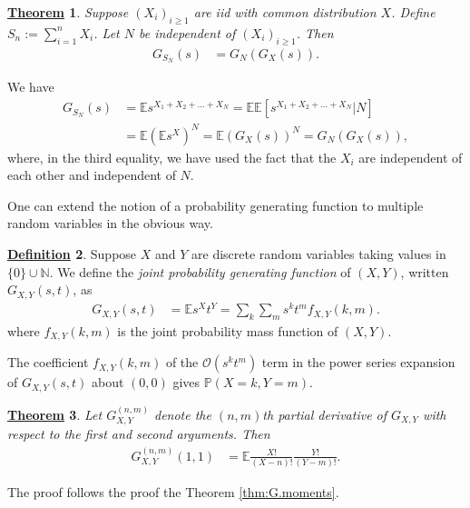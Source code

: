 \documentclass[12pt]{book}
\numberwithin{equation}{chapter}
\theoremstyle{plain}
\newtheorem{theorem}{\underline{Theorem}}
\numberwithin{theorem}{section}
\theoremstyle{definition}
\newtheorem{definition}[theorem]{\underline{Definition}}
\numberwithin{exercise}{chapter}
\let\oldendproof\endproof
\renewenvironment{proof}[1][\proofname]{%
  \oldproof[\scshape\underline{#1}]%
}{\oldendproof}
\newcommand{\<}{\langle}
\renewcommand{\>}{\rangle}
\renewcommand{\(}{\left(}
\renewcommand{\)}{\right)}
\renewcommand{\[}{\left[}
\renewcommand{\]}{\right]}
\newcommand\Eb{\mathds{E}}
\newcommand\Pb{\mathds{P}}
\newcommand\Nb{\mathds{N}}
\newcommand\Oc{\mathscr{O}}
\begin{document}
\begin{theorem}
\label{thm:random.sum}
Suppose $(X_i)_{i \geq 1}$ are iid with common distribution $X$.  Define $S_n := \sum_{i=1}^n X_i$.  
Let $N$ be independent of $(X_i)_{i \geq 1}$.  Then
\begin{align}
G_{S_N}(s)
	&=	G_N( G_X(s) )	.
\end{align}
\end{theorem}
\begin{proof}
We have
\begin{align}
G_{S_N}(s)
	&=	\Eb s^{X_1 + X_2 + \ldots + X_N}
	=		\Eb \Eb[ s^{X_1 + X_2 + \ldots + X_N} | N] \\
	&=	\Eb (\Eb s^X)^N 
	=		\Eb (G_X(s))^N  
	=		G_N( G_X(s) ) ,
\end{align}
where, in the third equality, we have used the fact that the $X_i$ are independent of each other and independent of $N$.
\end{proof}

\noindent
One can extend the notion of a probability generating function to multiple random variables in the obvious way.

\begin{definition}
Suppose $X$ and $Y$ are discrete random variables taking values in $\{0\} \cup \Nb$.  We define the \emph{joint probability generating function} of $(X,Y)$, written $G_{X,Y}(s,t)$, as
\begin{align}
G_{X,Y}(s,t)
	&=	\Eb s^X t^Y 
	=		\sum_k \sum_m s^k t^m f_{X,Y}(k,m) .
\end{align}
where $f_{X,Y}(k,m)$ is the joint probability mass function of $(X,Y)$.
\end{definition}

\noindent
The coefficient $f_{X,Y}(k,m)$ of the $\Oc(s^k t^m)$ term in the power series expansion of $G_{X,Y}(s,t)$ about $(0,0)$ gives $\Pb( X=k, Y=m)$.

\begin{theorem}
Let $G_{X,Y}^{(n,m)}$ denote the $(n,m)$th partial derivative of $G_{X,Y}$ with respect to the first and second arguments.  Then
\begin{align}
G_{X,Y}^{(n,m)}(1,1)
	&=	\Eb \frac{X!}{(X-n)!} \frac{Y!}{(Y-m)!}  . \label{eq:GXY.1}
\end{align}
\end{theorem}
\begin{proof}
The proof follows the proof the Theorem \ref{thm:G.moments}.
\end{proof}

\end{document}

